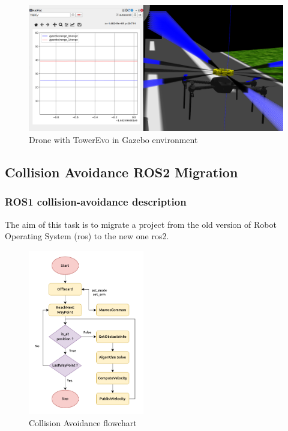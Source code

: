 \begin{figure}[H]
    \centering
    \includegraphics[width=0.75\linewidth]{./projects/ardupilot/gazebo_drone.png}
    \caption{Drone with TowerEvo in Gazebo environment}
\end{figure}

\subsection{Collision Avoidance ROS2 Migration}
\subsubsection{ ROS1 collision-avoidance description}

The aim of this task is to migrate a project from the old version of Robot Operating System (\gls{ros}) to the new one \gls{ros2}.

\begin{figure}
    \centering
    \includegraphics[width=0.45\textwidth]{./projects/ardupilot/ca_flowchart.png}
    \caption{Collision Avoidance flowchart}
    \label{fig:ca-flowchart}
\end{figure}

